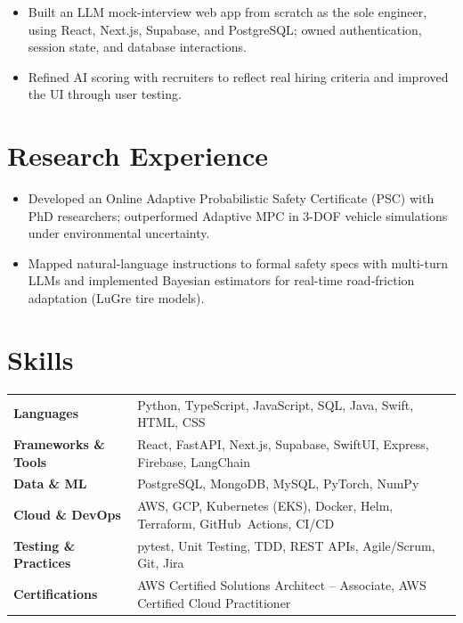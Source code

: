 \documentclass[11pt, letterpaper]{article}
\begin{document}
\vspace{1pt}
\begin{itemize}
  \item Built an LLM mock-interview web app from scratch as the sole engineer, using React, Next.js, Supabase, and PostgreSQL; owned authentication, session state, and database interactions.
  \item Refined AI scoring with recruiters to reflect real hiring criteria and improved the UI through user testing.
\end{itemize}

\section{Research Experience}
\begin{itemize}
  \item Developed an Online Adaptive Probabilistic Safety Certificate (PSC) with PhD researchers; outperformed Adaptive MPC in 3-DOF vehicle simulations under environmental uncertainty.
  \item Mapped natural-language instructions to formal safety specs with multi-turn LLMs and implemented Bayesian estimators for real-time road-friction adaptation (LuGre tire models).
\end{itemize}

\section{Skills}
\begin{tabularx}{\textwidth}{@{}l @{\hspace{7pt}} >{\raggedright\arraybackslash}X@{}}
  \textbf{Languages} & Python, TypeScript, JavaScript, SQL, Java, Swift, HTML, CSS \\[1pt]
  \textbf{Frameworks \& Tools} & React, FastAPI, Next.js, Supabase, SwiftUI, Express, Firebase, LangChain \\[1pt]
  \textbf{Data \& ML} & PostgreSQL, MongoDB, MySQL, PyTorch, NumPy \\[1pt]
  \textbf{Cloud \& DevOps} & AWS, GCP, Kubernetes (EKS), Docker, Helm, Terraform, GitHub~Actions, CI/CD \\[1pt]
  \textbf{Testing \& Practices} & pytest, Unit Testing, TDD, REST APIs, Agile/Scrum, Git, Jira \\[1pt]
  \textbf{Certifications} & AWS Certified Solutions Architect -- Associate, AWS Certified Cloud Practitioner \\
\end{tabularx}
\end{document}
